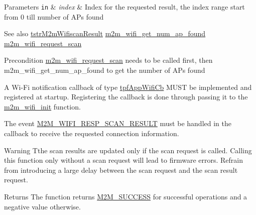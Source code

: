 \begin{DoxyParams}[1]{Parameters}
\mbox{\tt in}  & {\em index} & Index for the requested result, the index range start from 0 till number of AP\textquotesingle{}s found\\
\hline
\end{DoxyParams}
\begin{DoxySeeAlso}{See also}
\hyperlink{structtstrM2mWifiscanResult}{tstr\+M2m\+Wifiscan\+Result} \hyperlink{group__WifiGetNumAPFoundFn_gac92223273822358f4aee6e133b11815d}{m2m\+\_\+wifi\+\_\+get\+\_\+num\+\_\+ap\+\_\+found} \hyperlink{group__WifiRequestScanFn_ga499dfa24a19c2e84776aeabedf897135}{m2m\+\_\+wifi\+\_\+request\+\_\+scan}
\end{DoxySeeAlso}
\begin{DoxyPrecond}{Precondition}
\hyperlink{group__WifiRequestScanFn_ga499dfa24a19c2e84776aeabedf897135}{m2m\+\_\+wifi\+\_\+request\+\_\+scan} needs to be called first, then m2m\+\_\+wifi\+\_\+get\+\_\+num\+\_\+ap\+\_\+found to get the number of AP\textquotesingle{}s found
\begin{DoxyItemize}
\item A Wi-\/\+Fi notification callback of type \hyperlink{group__WlanEnums_gac5302f32839285fe8375c159087aa8a1}{tpf\+App\+Wifi\+Cb} M\+U\+ST be implemented and registered at startup. Registering the callback is done through passing it to the \hyperlink{group__WifiInitFn_ga73c734812e844d96d860c4e93e9daf35}{m2m\+\_\+wifi\+\_\+init} function.
\item The event \hyperlink{group__WlanEnums_gga064de09dec1d5e88ed8d075fa40f57deadfb48e88c3a8e5f9dac634d62d3f53e5}{M2\+M\+\_\+\+W\+I\+F\+I\+\_\+\+R\+E\+S\+P\+\_\+\+S\+C\+A\+N\+\_\+\+R\+E\+S\+U\+LT} must be handled in the callback to receive the requested connection information. 
\end{DoxyItemize}
\end{DoxyPrecond}
\begin{DoxyWarning}{Warning}
Tthe scan results are updated only if the scan request is called. Calling this function only without a scan request will lead to firmware errors. Refrain from introducing a large delay between the scan request and the scan result request.
\end{DoxyWarning}
\begin{DoxyReturn}{Returns}
The function returns \hyperlink{nm__common_8h_a9ef27ba27aafdd1aa3a79d3ba2c36b8f}{M2\+M\+\_\+\+S\+U\+C\+C\+E\+SS} for successful operations and a negative value otherwise. 
\end{DoxyReturn}
